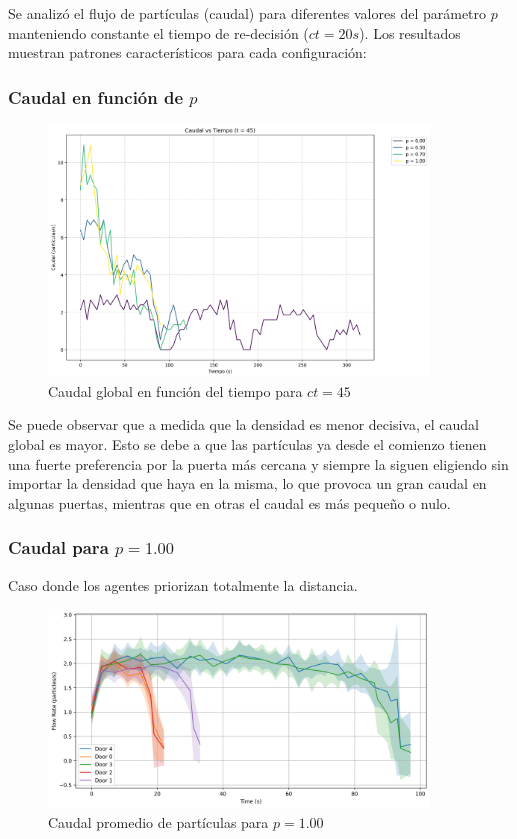 \documentclass[12pt]{article}
\begin{document}
Se analizó el flujo de partículas (caudal) para diferentes valores del parámetro $p$ manteniendo constante el tiempo de re-decisión ($ct=20s$). Los resultados muestran patrones característicos para cada configuración:

\subsubsection{Caudal en función de $p$}

\begin{figure}[H]
    \centering
    \includegraphics[width=0.9\textwidth]{img/caudal_vs_time_t45.png}
    \caption{Caudal global en función del tiempo para $ct=45$}
    \label{fig:flow_p100}
\end{figure}
Se puede observar que a medida que la densidad es menor decisiva, el caudal global es mayor. Esto se debe a que las partículas ya desde el comienzo tienen una fuerte preferencia por la puerta más cercana y siempre la siguen eligiendo sin importar la densidad que haya en la misma, lo que provoca un gran caudal en algunas puertas, mientras que en otras el caudal es más pequeño o nulo.

\subsubsection{Caudal para $p = 1.00$}
Caso donde los agentes priorizan totalmente la distancia.

\begin{figure}[H]
    \centering
    \includegraphics[width=0.9\textwidth]{img/door_flow_rates_t_20_&_p_1.00.png}
    \caption{Caudal promedio de partículas para $p=1.00$}
    \label{fig:caudal_p100}
\end{figure}
\end{document}
